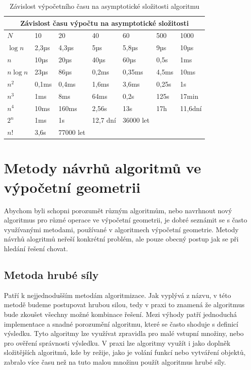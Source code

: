 	
\begin{table}

\begin{tabular}{ |p{1.4cm}||p{1.6cm}|p{1.6cm}|p{1.6cm}|p{1.6cm}|p{1.6cm}|p{1.6cm}|  }
\hline
\multicolumn{7}{|c|}{Závislost času výpočtu na asymptotické složitosti} \\
\hline

$N$				&10			&20			&40			&60			&500		&1000\\
\hline
$\log n$		&2,3µs		&4,3µs		&5µs		&5,8µs		&9µs		&10µs\\			
$n$				&10µs		&20µs		&40µs		&60µs		&0,5s		&1ms\\
$n \log n$		&23µs		&86µs		&0,2ms		&0,35ms		&4,5ms		&10ms\\
$n^2$			&0,1ms		&0,4ms		&1,6ms		&3,6ms		&0,25s		&1s\\
$n^3$			&1ms		&8ms		&64ms		&0,2s		&125s		&17min\\
$n^4$			&10ms		&160ms		&2,56s		&13s		&17h		&11,6dní\\
$2^n$			&1ms		&1s			&12,7 dní	&36000 let	&			&\\
$n!$			&3,6s		&77000 let	&			&			&			&\\
\hline

\end{tabular}
\caption{Závislost výpočetního času na asymptotické složitosti algoritmu}
\label{tab:4-time_complexity}
\end{table}






\section{Metody návrhů algoritmů ve výpočetní geometrii}
	Abychom byli schopni porozumět různým algoritmům, nebo navrhnout nový algoritmus pro různé operace ve výpočetní geometrii, je dobré seznámit se s často využívanými metodami, používané v algoritmech výpočetní geometrie. Metody návrhů alogritmů neřeší konkrétní problém, ale pouze obecný postup jak se při hledání řešení chovat.

\subsection{Metoda hrubé síly}
	Patří k nejjednodušším metodám algoritmizace. Jak vyplývá z názvu, v této metodě budeme postupovat hrubou silou, tedy v praxi to znamená že algoritmus bude zkoušet všechny možné kombinace řešení. Mezi výhody patří jednoduchá implementace a snadné porozumění algoritmu, které se často shoduje s definicí výsledku. Tyto algoritmy lze využívat zpravidla pro malé vstupní množiny, nebo pro ověření správnosti výsledku. V praxi lze algoritmy využít i jako doplněk složitějších algoritmů, kde by režije, jako je volání funkcí nebo vytváření objektů, zabralo více času než na tuto malou množinu použít algoritmus hrubé síly.
	
